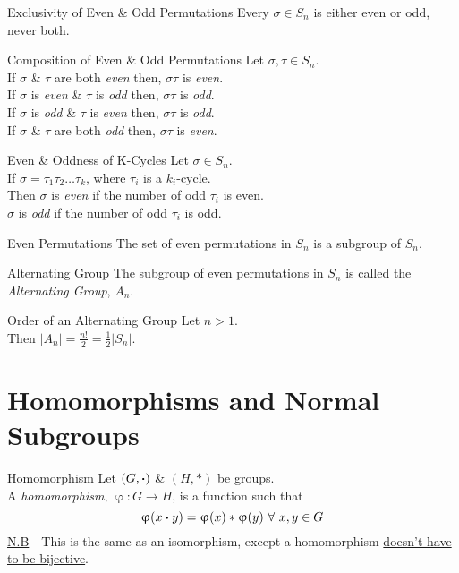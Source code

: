 \documentclass[11pt,a4paper]{article}
\begin{document}
\subtitle{Theorem 14.05 - }{Exclusivity of Even \& Odd Permutations}
Every $\sigma \in S_n$ is either even or odd, never both.\\

\subtitle{Proposition 14.06 - }{Composition of Even \& Odd Permutations}
Let $\sigma, \tau \in S_n$.\\
If $\sigma$ \& $\tau$ are both \textit{even} then, $\sigma\tau$ is \textit{even}.\\
If $\sigma$ is \textit{even} \& $\tau$ is \textit{odd} then, $\sigma\tau$ is \textit{odd}.\\
If $\sigma$ is \textit{odd} \& $\tau$ is \textit{even} then, $\sigma\tau$ is \textit{odd}.\\
If $\sigma$ \& $\tau$ are both \textit{odd} then, $\sigma\tau$ is \textit{even}.\\

\subtitle{Proposition 14.07 - }{Even \& Oddness of K-Cycles}
Let $\sigma \in S_n$.\\
If $\sigma = \tau_1\tau_2 \dots \tau_k$, where $\tau_i$ is a $k_i$-cycle.\\
Then $\sigma$ is \textit{even} if the number of odd $\tau_i$ is even.\\
$\sigma$ is \textit{odd} if the number of odd $\tau_i$ is odd.\\

\subtitle{Proposition 14.08 - }{Even Permutations}
The set of even permutations in $S_n$ is a subgroup of $S_n$.\\

\subtitle{Definition 14.09 - }{Alternating Group}
The subgroup of even permutations in $S_n$ is called the \textit{Alternating Group}, $A_n$.\\

\subtitle{Theorem 14.10 - }{Order of an Alternating Group}
Let $n > 1$.\\
Then $|A_n| = \frac{n!}{2} = \frac{1}{2}|S_n|$.

\section{Homomorphisms and Normal Subgroups}

\subtitle{Definition 15.01 - }{Homomorphism}
Let $(G, \boldsymbol{\cdot})$ \& $(H, *)$ be groups.\\
A \textit{homomorphism}, $\upvarphi : G \to H$, is  a function such that
$$\upvarphi(x \boldsymbol{\cdot} y) = \upvarphi(x) * \upvarphi(y)\ \forall\ x, y \in G$$
\underline{N.B} - This is the same as an isomorphism, except a homomorphism \underline{doesn't have to be bijective}.\\
\end{document}
